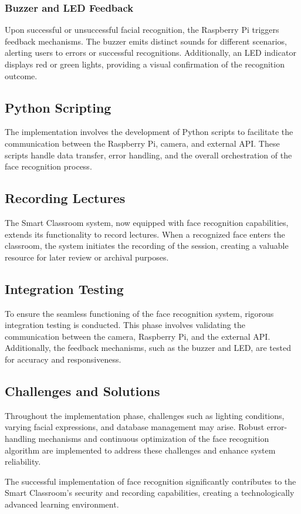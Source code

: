 \documentclass[11pt]{article}
\begin{document}
	\subsubsection{Buzzer and LED Feedback}
	Upon successful or unsuccessful facial recognition, the Raspberry Pi triggers feedback mechanisms. The buzzer emits distinct sounds for different scenarios, alerting users to errors or successful recognitions. Additionally, an LED indicator displays red or green lights, providing a visual confirmation of the recognition outcome.
	
	\subsection{Python Scripting}
	The implementation involves the development of Python scripts to facilitate the communication between the Raspberry Pi, camera, and external API. These scripts handle data transfer, error handling, and the overall orchestration of the face recognition process.
	
	\subsection{Recording Lectures}
	The Smart Classroom system, now equipped with face recognition capabilities, extends its functionality to record lectures. When a recognized face enters the classroom, the system initiates the recording of the session, creating a valuable resource for later review or archival purposes.
	
	\subsection{Integration Testing}
	To ensure the seamless functioning of the face recognition system, rigorous integration testing is conducted. This phase involves validating the communication between the camera, Raspberry Pi, and the external API. Additionally, the feedback mechanisms, such as the buzzer and LED, are tested for accuracy and responsiveness.
	
	\subsection{Challenges and Solutions}
	Throughout the implementation phase, challenges such as lighting conditions, varying facial expressions, and database management may arise. Robust error-handling mechanisms and continuous optimization of the face recognition algorithm are implemented to address these challenges and enhance system reliability.
	
	The successful implementation of face recognition significantly contributes to the Smart Classroom's security and recording capabilities, creating a technologically advanced learning environment.
	
	\pagebreak
	
\end{document}
